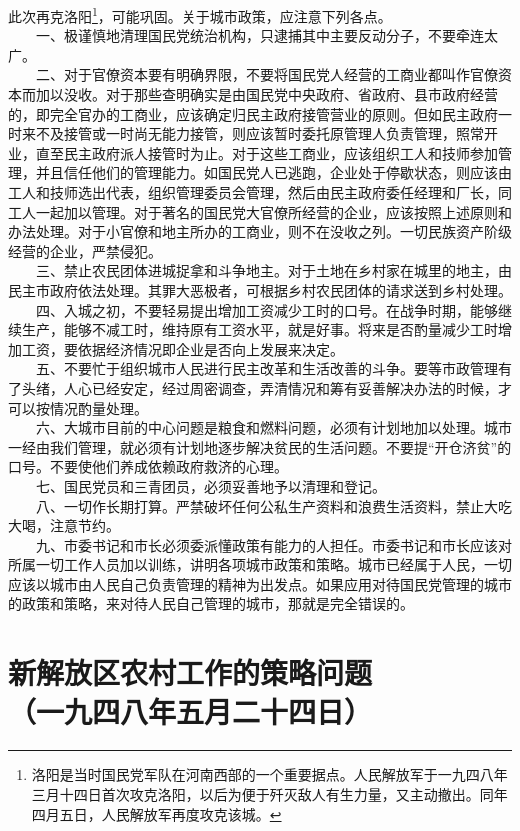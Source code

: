 \documentclass[cn,11pt,chinese]{elegantbook}
\def\myformat#1{\hfil\hfil #1}
\begin{document}
此次再克洛阳\footnote[1]{ 洛阳是当时国民党军队在河南西部的一个重要据点。人民解放军于一九四八年三月十四日首次攻克洛阳，以后为便于歼灭敌人有生力量，又主动撤出。同年四月五日，人民解放军再度攻克该城。}，可能巩固。关于城市政策，应注意下列各点。\\
　　一、极谨慎地清理国民党统治机构，只逮捕其中主要反动分子，不要牵连太广。\\
　　二、对于官僚资本要有明确界限，不要将国民党人经营的工商业都叫作官僚资本而加以没收。对于那些查明确实是由国民党中央政府、省政府、县市政府经营的，即完全官办的工商业，应该确定归民主政府接管营业的原则。但如民主政府一时来不及接管或一时尚无能力接管，则应该暂时委托原管理人负责管理，照常开业，直至民主政府派人接管时为止。对于这些工商业，应该组织工人和技师参加管理，并且信任他们的管理能力。如国民党人已逃跑，企业处于停歇状态，则应该由工人和技师选出代表，组织管理委员会管理，然后由民主政府委任经理和厂长，同工人一起加以管理。对于著名的国民党大官僚所经营的企业，应该按照上述原则和办法处理。对于小官僚和地主所办的工商业，则不在没收之列。一切民族资产阶级经营的企业，严禁侵犯。\\
　　三、禁止农民团体进城捉拿和斗争地主。对于土地在乡村家在城里的地主，由民主市政府依法处理。其罪大恶极者，可根据乡村农民团体的请求送到乡村处理。\\
　　四、入城之初，不要轻易提出增加工资减少工时的口号。在战争时期，能够继续生产，能够不减工时，维持原有工资水平，就是好事。将来是否酌量减少工时增加工资，要依据经济情况即企业是否向上发展来决定。\\
　　五、不要忙于组织城市人民进行民主改革和生活改善的斗争。要等市政管理有了头绪，人心已经安定，经过周密调查，弄清情况和筹有妥善解决办法的时候，才可以按情况酌量处理。\\
　　六、大城市目前的中心问题是粮食和燃料问题，必须有计划地加以处理。城市一经由我们管理，就必须有计划地逐步解决贫民的生活问题。不要提“开仓济贫”的口号。不要使他们养成依赖政府救济的心理。\\
　　七、国民党员和三青团员，必须妥善地予以清理和登记。\\
　　八、一切作长期打算。严禁破坏任何公私生产资料和浪费生活资料，禁止大吃大喝，注意节约。\\
　　九、市委书记和市长必须委派懂政策有能力的人担任。市委书记和市长应该对所属一切工作人员加以训练，讲明各项城市政策和策略。城市已经属于人民，一切应该以城市由人民自己负责管理的精神为出发点。如果应用对待国民党管理的城市的政策和策略，来对待人民自己管理的城市，那就是完全错误的。
\newpage\section*{\myformat{新解放区农村工作的策略问题}\\\myformat{（一九四八年五月二十四日）}}
\end{document}
